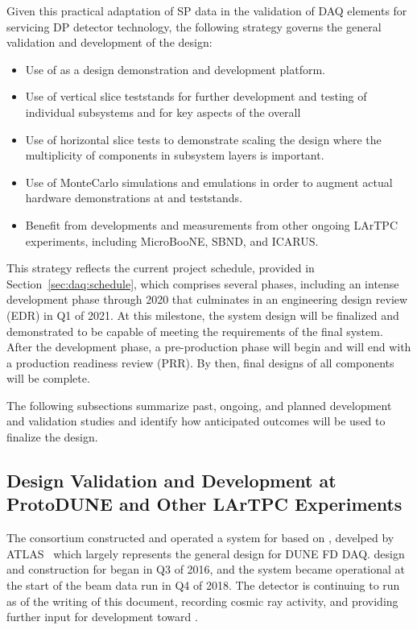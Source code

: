 Given this practical adaptation of SP data in the validation of DAQ
elements for servicing DP detector technology, the following strategy
governs the general validation and development of the 
  design:
\begin{itemize}
\item Use of  as a design demonstration and
  development platform. 
\item Use of vertical slice teststands for further development and testing of
  individual  subsystems and for key aspects of the
  overall 
\item Use of horizontal slice tests to demonstrate scaling the design
  where the multiplicity of components in subsystem layers is important.
\item Use of  MonteCarlo simulations and emulations in order
  to augment actual hardware demonstrations at  and teststands.
\item Benefit from developments and measurements from other ongoing
  LArTPC experiments, including MicroBooNE, SBND, and ICARUS.
\end{itemize}

This strategy reflects the current  project schedule,
provided in Section~\ref{sec:daq:schedule}, which
comprises several phases, including an intense development phase
through 2020 that culminates in an engineering design
review (EDR) in Q1 of 2021. At this milestone, the system design will be
finalized and demonstrated to be capable of meeting the requirements of the
final  system. After the development phase, a
pre-production phase will begin and will end with a production readiness
review (PRR). By then, final designs of all components
will be complete.

The following subsections summarize past, ongoing, and planned
development and validation studies and identify how anticipated outcomes
will be used to finalize the  design.

\subsection{Design Validation and Development at ProtoDUNE and Other
  LArTPC Experiments}


\label{sec:daq:protodune}

The   consortium constructed and operated a
 system for  based on ,
develped by ATLAS~\cite{pdsp-felix} which largely represents the general
design for DUNE FD DAQ.
 design and construction for  began in Q3 of
2016, and the system became operational at the start of the beam data
run in Q4 of 2018.
The detector is continuing to run as of the writing of this document,
recording cosmic ray activity, and providing further input for
 development toward . 

